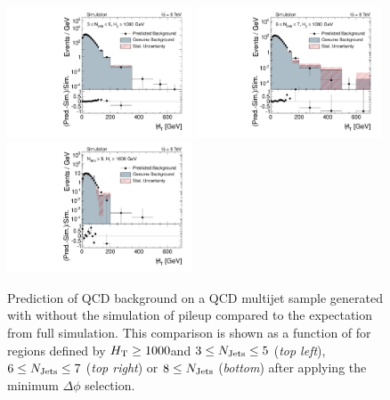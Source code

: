  \begin{figure}[!t]
  \centering

  \begin{minipage}[c]{1.\textwidth}
    \begin{center}
      \includegraphics[width=0.49\textwidth]{figures/MHT_JetBin2_HThigh_pythia_chsJets_pt0_NoPU_v1.pdf}%
      \includegraphics[width=0.49\textwidth]{figures/MHT_JetBin3_HThigh_pythia_chsJets_pt0_NoPU_v1.pdf}\\ 
      \includegraphics[width=0.49\textwidth]{figures/MHT_JetBin4_HThigh_pythia_chsJets_pt0_NoPU_v1.pdf}
    \end{center}
  \end{minipage}
  \caption{Prediction of QCD background on a QCD multijet sample generated with \pythia without the simulation of pileup compared to the expectation from full simulation. This comparison is shown as a function of \MHT for regions defined by $H_{\text{T}} \ge 1000$\gev and $3 \le N_{\text{Jets}} \le 5$ (\textit{top left}), $6 \le N_{\text{Jets}} \le 7$ (\textit{top right}) or $8 \le N_{\text{Jets}}$ (\textit{bottom}) after applying the minimum $\Delta \phi$ selection.}
  \label{fig:qcd_rs_closure_nopu}
\end{figure}
